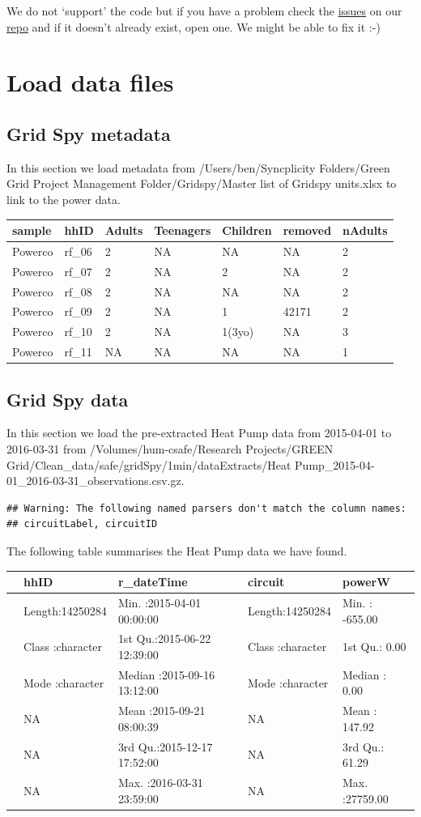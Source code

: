\documentclass[]{article}
\begin{document}
We do not `support' the code but if you have a problem check the
\href{https://git.soton.ac.uk/ba1e12/nzGREENGrid/issues}{issues} on our
\href{https://git.soton.ac.uk/ba1e12/nzGREENGrid}{repo} and if it
doesn't already exist, open one. We might be able to fix it :-)

\section{Load data files}\label{load-data-files}

\subsection{Grid Spy metadata}\label{grid-spy-metadata}

In this section we load metadata from /Users/ben/Syncplicity
Folders/Green Grid Project Management Folder/Gridspy/Master list of
Gridspy units.xlsx to link to the power data.

\begin{longtable}[]{@{}lllllll@{}}
\toprule
sample & hhID & Adults & Teenagers & Children & removed &
nAdults\tabularnewline
\midrule
\endhead
Powerco & rf\_06 & 2 & NA & NA & NA & 2\tabularnewline
Powerco & rf\_07 & 2 & NA & 2 & NA & 2\tabularnewline
Powerco & rf\_08 & 2 & NA & NA & NA & 2\tabularnewline
Powerco & rf\_09 & 2 & NA & 1 & 42171 & 2\tabularnewline
Powerco & rf\_10 & 2 & NA & 1(3yo) & NA & 3\tabularnewline
Powerco & rf\_11 & NA & NA & NA & NA & 1\tabularnewline
\bottomrule
\end{longtable}

\subsection{Grid Spy data}\label{grid-spy-data}

In this section we load the pre-extracted Heat Pump data from 2015-04-01
to 2016-03-31 from /Volumes/hum-csafe/Research Projects/GREEN
Grid/Clean\_data/safe/gridSpy/1min/dataExtracts/Heat
Pump\_2015-04-01\_2016-03-31\_observations.csv.gz.

\begin{verbatim}
## Warning: The following named parsers don't match the column names:
## circuitLabel, circuitID
\end{verbatim}

The following table summarises the Heat Pump data we have found.

\begin{longtable}[]{@{}lllll@{}}
\toprule
& hhID & r\_dateTime & circuit & powerW\tabularnewline
\midrule
\endhead
& Length:14250284 & Min. :2015-04-01 00:00:00 & Length:14250284 & Min. :
-655.00\tabularnewline
& Class :character & 1st Qu.:2015-06-22 12:39:00 & Class :character &
1st Qu.: 0.00\tabularnewline
& Mode :character & Median :2015-09-16 13:12:00 & Mode :character &
Median : 0.00\tabularnewline
& NA & Mean :2015-09-21 08:00:39 & NA & Mean : 147.92\tabularnewline
& NA & 3rd Qu.:2015-12-17 17:52:00 & NA & 3rd Qu.: 61.29\tabularnewline
& NA & Max. :2016-03-31 23:59:00 & NA & Max. :27759.00\tabularnewline
\bottomrule
\end{longtable}
\end{document}
